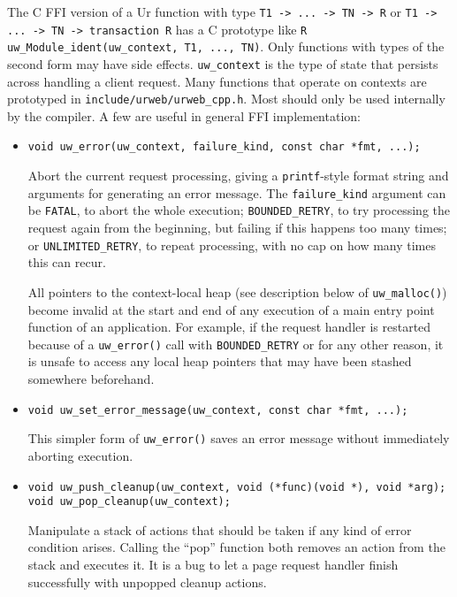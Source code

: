 \documentclass{article}
\begin{document}
The C FFI version of a Ur function with type \texttt{T1 -> ... -> TN -> R} or \texttt{T1 -> ... -> TN -> transaction R} has a C prototype like \texttt{R uw\_Module\_ident(uw\_context, T1, ..., TN)}.  Only functions with types of the second form may have side effects.  \texttt{uw\_context} is the type of state that persists across handling a client request.  Many functions that operate on contexts are prototyped in \texttt{include/urweb/urweb\_cpp.h}.  Most should only be used internally by the compiler.  A few are useful in general FFI implementation:
\begin{itemize}
  \item \begin{verbatim}
void uw_error(uw_context, failure_kind, const char *fmt, ...);
  \end{verbatim}
  Abort the current request processing, giving a \texttt{printf}-style format string and arguments for generating an error message.  The \texttt{failure\_kind} argument can be \texttt{FATAL}, to abort the whole execution; \texttt{BOUNDED\_RETRY}, to try processing the request again from the beginning, but failing if this happens too many times; or \texttt{UNLIMITED\_RETRY}, to repeat processing, with no cap on how many times this can recur.

  All pointers to the context-local heap (see description below of \texttt{uw\_malloc()}) become invalid at the start and end of any execution of a main entry point function of an application.  For example, if the request handler is restarted because of a \texttt{uw\_error()} call with \texttt{BOUNDED\_RETRY} or for any other reason, it is unsafe to access any local heap pointers that may have been stashed somewhere beforehand.

  \item \begin{verbatim}
void uw_set_error_message(uw_context, const char *fmt, ...);
  \end{verbatim}
  This simpler form of \texttt{uw\_error()} saves an error message without immediately aborting execution.

  \item \begin{verbatim}
void uw_push_cleanup(uw_context, void (*func)(void *), void *arg);
void uw_pop_cleanup(uw_context);
  \end{verbatim}
  Manipulate a stack of actions that should be taken if any kind of error condition arises.  Calling the ``pop'' function both removes an action from the stack and executes it.  It is a bug to let a page request handler finish successfully with unpopped cleanup actions.


\end{itemize}
\end{document}
